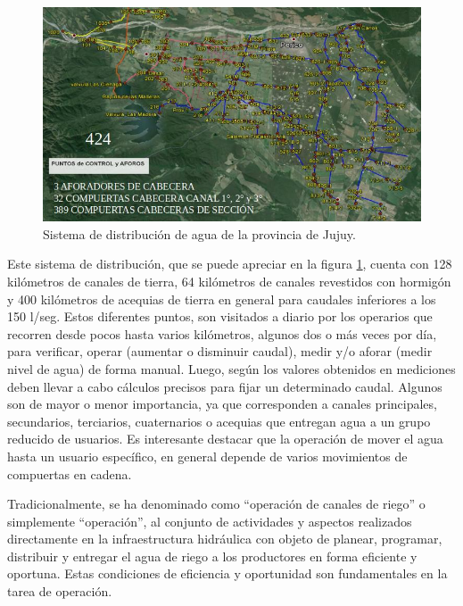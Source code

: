 \begin{figure}[h]
\centering
\includegraphics[scale=.70]{./Figures/canal.jpeg}
\caption{Sistema de distribución de agua de la provincia de Jujuy.}
\label{fig:canal}
\end{figure}

Este sistema de distribución, que se puede apreciar en la figura \ref{fig:canal}, cuenta con 128 kilómetros de canales de tierra, 64 kilómetros de canales revestidos con hormigón y 400 kilómetros de acequias de tierra en general para caudales inferiores a los 150 l/seg.
Estos diferentes puntos, son visitados a diario por los operarios que recorren desde pocos hasta varios kilómetros, algunos dos o más veces por día, para verificar, operar (aumentar o disminuir caudal), medir y/o aforar (medir nivel de agua) de forma manual. Luego, según los valores obtenidos en mediciones deben llevar a cabo cálculos precisos para fijar un determinado caudal. Algunos son de mayor o menor importancia, ya que corresponden a canales principales, secundarios, terciarios, cuaternarios o acequias que entregan agua a un grupo reducido de usuarios.
Es interesante destacar que la operación de mover el agua hasta un usuario específico, en general depende de varios movimientos de compuertas en cadena.

Tradicionalmente, se ha denominado como “operación de canales de riego” o simplemente “operación”, al conjunto de actividades y aspectos realizados directamente en la infraestructura hidráulica con objeto de planear, programar, distribuir y entregar el agua de riego a los productores en forma eficiente y oportuna. Estas condiciones de eficiencia y oportunidad son fundamentales en la tarea de operación.

